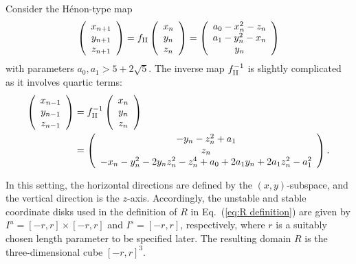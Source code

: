 \documentclass[12pt]{iopart}
\begin{document}
Consider the H\'{e}non-type map
\begin{equation}\label{eq:3D doubly folded Henon}
\left( \begin{array}{ccc}
x_{n+1}\\
y_{n+1} \\
z_{n+1} \end{array} \right) = 
f_{\rm II} \left( \begin{array}{ccc}
x_{n}\\
y_{n} \\
z_{n} \end{array} \right) =
\left( \begin{array}{ccc}
a_0 - x^2_n - z_n\\
a_1 - y^2_n - x_n\\
y_n \end{array} \right)
\end{equation}
with parameters $a_0,a_1 > 5+2\sqrt{5}$. The inverse map $f^{-1}_{\rm II}$ is slightly complicated as it involves quartic terms:
\begin{eqnarray}
 \left( \begin{array}{ccc}
x_{n-1}\\
y_{n-1} \\
z_{n-1} \end{array} \right) & = f^{-1}_{\rm II} \left( \begin{array}{ccc}
x_{n}\\
y_{n} \\
z_{n} \end{array} \right) \nonumber \\
& =
\left( \begin{array}{ccc}
-y_n - z^2_n + a_1\\
z_n\\
-x_n - y^2_n -2 y_n z^2_n - z^4_n + a_0 + 2 a_1 y_n + 2 a_1 z^2_n - a^2_1 \end{array} \right). \label{eq:f II inverse}
\end{eqnarray}

In this setting, the horizontal directions are defined by the \( (x,y) \)-subspace, and the vertical direction is the \( z \)-axis. Accordingly, the unstable and stable coordinate disks used in the definition of \( R \) in Eq.~(\ref{eq:R definition}) are given by \( I^u = [-r,r] \times [-r,r] \) and \( I^s = [-r,r] \), respectively, where $r$ is a suitably chosen length parameter to be specified later. The resulting domain $R$ is the three-dimensional cube $[-r,r]^3$. 
\end{document}
